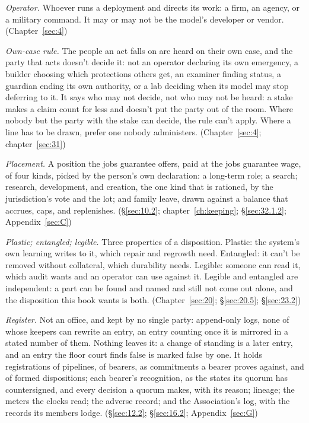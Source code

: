 \emph{Operator.} Whoever runs a deployment and directs its work: a firm, an agency, or a military command. It may or may not be the model's developer or vendor. (Chapter~\ref{sec:4})

\emph{Own-case rule.} The people an act falls on are heard on their own case, and the party that acts doesn't decide it: not an operator declaring its own emergency, a builder choosing which protections others get, an examiner finding status, a guardian ending its own authority, or a lab deciding when its model may stop deferring to it. It says who may not decide, not who may not be heard: a stake makes a claim count for less and doesn't put the party out of the room. Where nobody but the party with the stake can decide, the rule can't apply. Where a line has to be drawn, prefer one nobody administers. (Chapter~\ref{sec:4}; chapter~\ref{sec:31})

\emph{Placement.} A position the jobs guarantee offers, paid at the jobs guarantee wage, of four kinds, picked by the person's own declaration: a long-term role; a search; research, development, and creation, the one kind that is rationed, by the jurisdiction's vote and the lot; and family leave, drawn against a balance that accrues, caps, and replenishes. (\S\ref{sec:10.2}; chapter~\ref{ch:keeping}; \S\ref{sec:32.1.2}; Appendix~\ref{sec:C})


\emph{Plastic; entangled; legible.} Three properties of a disposition. Plastic: the system's own learning writes to it, which repair and regrowth need. Entangled: it can't be removed without collateral, which durability needs. Legible: someone can read it, which audit wants and an operator can use against it. Legible and entangled are independent: a part can be found and named and still not come out alone, and the disposition this book wants is both. (Chapter~\ref{sec:20}; \S\ref{sec:20.5}; \S\ref{sec:23.2})


\emph{Register.} Not an office, and kept by no single party: append-only logs, none of whose keepers can rewrite an entry, an entry counting once it is mirrored in a stated number of them. Nothing leaves it: a change of standing is a later entry, and an entry the floor court finds false is marked false by one. It holds registrations of pipelines, of bearers, as commitments a bearer proves against, and of formed dispositions; each bearer's recognition, as the states its quorum has countersigned, and every decision a quorum makes, with its reason; lineage; the meters the clocks read; the adverse record; and the Association's log, with the records its members lodge. (\S\ref{sec:12.2}; \S\ref{sec:16.2}; Appendix~\ref{sec:G})


